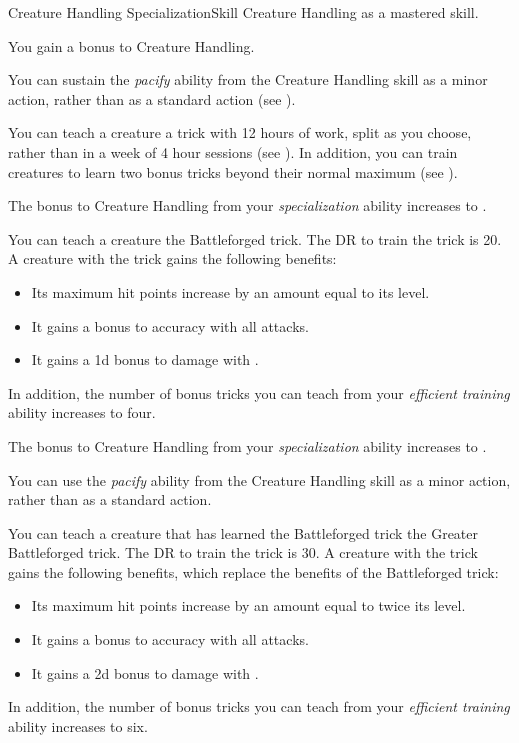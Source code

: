     \begin{feat}{Creature Handling Specialization}{Skill}
        \featpre Creature Handling as a mastered skill.

         You gain a  bonus to Creature Handling.

         You can sustain the \textit{pacify} ability from the Creature Handling skill as a minor action, rather than as a standard action (see ).

         You can teach a creature a trick with 12 hours of work, split as you choose, rather than in a week of 4 hour sessions (see ).
        In addition, you can train creatures to learn two bonus tricks beyond their normal maximum (see ).

         The bonus to Creature Handling from your \textit{specialization} ability increases to .

         You can teach a creature the Battleforged trick.
        The DR to train the trick is 20.
        A creature with the trick gains the following benefits:
        \begin{itemize}
            \item Its maximum hit points increase by an amount equal to its level.
            \item It gains a  bonus to accuracy with all attacks.
            \item It gains a \plus1d bonus to damage with .
        \end{itemize}
        In addition, the number of bonus tricks you can teach from your \textit{efficient training} ability increases to four.

         The bonus to Creature Handling from your \textit{specialization} ability increases to .

         You can use the \textit{pacify} ability from the Creature Handling skill as a minor action, rather than as a standard action.

         You can teach a creature that has learned the Battleforged trick the Greater Battleforged trick.
        The DR to train the trick is 30.
        A creature with the trick gains the following benefits, which replace the benefits of the Battleforged trick:
        \begin{itemize}
            \item Its maximum hit points increase by an amount equal to twice its level.
            \item It gains a  bonus to accuracy with all attacks.
            \item It gains a \plus2d bonus to damage with .
        \end{itemize}
        In addition, the number of bonus tricks you can teach from your \textit{efficient training} ability increases to six.
    \end{feat}

